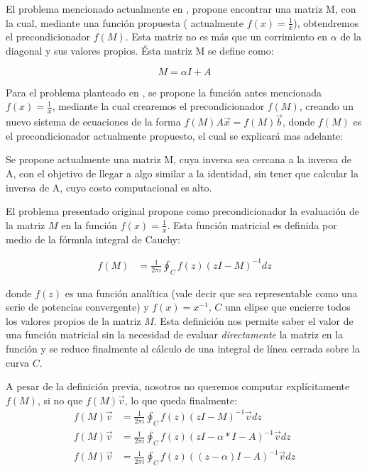 \documentclass[fleqn]{article}
\begin{document}
\newpage
El problema mencionado actualmente en \cite{1}, propone encontrar una matriz M, con la cual, mediante una función propuesta ( actualmente $f(x) = \frac{1}{x}$), obtendremos el precondicionador $f(M)$.
Esta matriz no es más que un corrimiento en $\alpha$ de la diagonal y sus valores propios. Ésta matriz M se define como:


\begin{equation}
 M= \alpha I + A 
\end{equation}

Para el problema planteado en \cite{1}, se propone la función antes mencionada $f(x) = \frac{1}{x}$, mediante la cual crearemos el precondicionador $f(M)$, creando un nuevo sistema de ecuaciones de la forma $f(M)A\vec{x} = f(M)\vec{b}$, donde $f(M)$ es el precondicionador actualmente propuesto, el cual se explicará mas adelante:

Se propone actualmente una matriz M, cuya inversa sea cercana a la inversa de A, con el objetivo de llegar a algo similar a la identidad, sin tener que calcular la inversa de A, cuyo costo computacional es alto.

El problema presentado original propone como precondicionador la evaluación de la matriz $M$ en la función $f(x) = \frac{1}{x}$. Esta función matricial es definida por medio de la fórmula integral de Cauchy:

\begin{align*}
f(M) &= \frac{1}{2\pi i} \oint_C f(z)(zI - M)^{-1}dz
\end{align*}

donde $f(z)$ es una función analítica (vale decir que sea representable como una serie de potencias convergente) y $f(x) = x^{-1}$, $C$ una elipse que encierre todos los valores propios de la matriz $M$. Esta definición nos permite saber el valor de una función matricial sin la necesidad de evaluar \textit{directamente} la matriz en la función y se reduce finalmente al cálculo de una integral de línea cerrada sobre la curva $C$.

A pesar de la definición previa, nosotros no queremos computar explícitamente $f(M)$, si no que $f(M)\vec{v}$, lo que queda finalmente:
\begin{align*}
f(M)\vec{v} &= \frac{1}{2\pi i} \oint_C f(z)(zI - M)^{-1}\vec{v}dz\\
f(M)\vec{v} &= \frac{1}{2\pi i} \oint_C f(z)(zI - \alpha*I -A)^{-1}\vec{v}dz\\
f(M)\vec{v} &= \frac{1}{2\pi i} \oint_C f(z)((z - \alpha)I -A)^{-1}\vec{v}dz
\end{align*}
\end{document}
